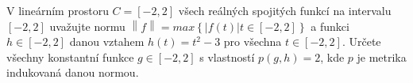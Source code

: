 V lineárním prostoru $C=\left [ -2,2 \right ]$ všech reálných spojitých funkcí
na intervalu $\left [ -2,2 \right ]$ uvažujte normu $\left \| f \right
\|=max\left \{ \left | f(t) \right | t \in \left [ -2,2 \right ] \right \}$ a
funkci $h \in \left [ -2,2 \right ]$ danou vztahem $h(t) = t^2 - 3$ pro všechna
$t \in \left [-2,2 \right ]$. Určete všechny konstantní funkce $g \in \left [
-2,2 \right ]$ s vlastností $p(g,h) = 2$, kde $p$ je metrika indukovaná danou
normou.

